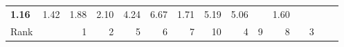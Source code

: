 \begin{tabular}{ll|rrrrrr|rrrrrrr}
  


  
  \textbf{1.16} & 1.42 & 1.88 & 2.10 & 4.24 & 6.67 & 1.71 & 5.19 & 5.06 &  & 1.60 \\

  Rank & &
  1 & 2 & 5 & 6 & 7 & 10 & 4 & 9 & 8 &  & 3 \\\hline\hline
  

\end{tabular}
